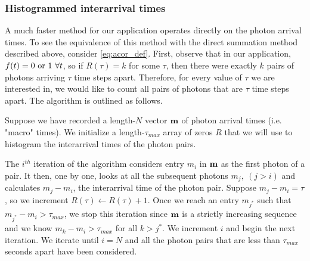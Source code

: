 \subsubsection{Histogrammed interarrival times}
A much faster method for our application operates directly on the photon arrival times. To see the equivalence of this method with the direct summation method described above, consider \autoref{eq:acor_def}. First, observe that in our application, $f(t) = 0~\textnormal{or}~1~\forall t$, so if $R(\tau) = k$ for some $\tau$, then there were exactly $k$ pairs of photons arriving $\tau$ time steps apart. Therefore, for every value of $\tau$ we are interested in, we would like to count all pairs of photons that are $\tau$ time steps apart. The algorithm is outlined as follows.

Suppose we have recorded a length-$N$ vector $\vb{m}$ of photon arrival times (i.e. "macro" times). We initialize a length-$\tau_{max}$ array of zeros $R$ that we will use to histogram the interarrival times of the photon pairs.

The $i^{th}$ iteration of the algorithm considers entry $m_i$ in $\vb{m}$ as the first photon of a pair. It then, one by one, looks at all the subsequent photons $m_j,~(j>i)$ and calculates $m_j-m_i$, the interarrival time of the photon pair. Suppose $m_j-m_i=\tau$, so we increment $R(\tau) \leftarrow R(\tau) + 1$. Once we reach an entry $m_{j^*}$ such that $m_{j^*}-m_i>\tau_{max}$, we stop this iteration since $\vb{m}$ is a strictly increasing sequence and we know $m_{k}-m_i>\tau_{max}$ for all $k>j^*$. We increment $i$ and begin the next iteration. We iterate until $i = N$ and all the photon pairs that are less than $\tau_{max}$ seconds apart have been considered.

%

